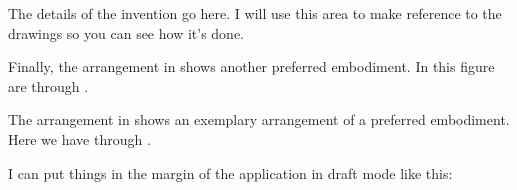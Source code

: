 

\npar The details of the invention go here. I will use this area to make reference to the drawings so you can see how it's done. 



\npar Finally, the arrangement in  shows another preferred embodiment. In this figure are   through .

\npar The arrangement in  shows an exemplary arrangement of a preferred embodiment. Here we have     through . 



\npar I can put things in the margin of the application in draft mode like this: 

